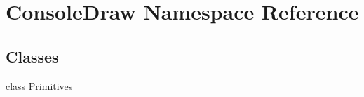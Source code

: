 \hypertarget{namespace_console_draw}{}\section{Console\+Draw Namespace Reference}
\label{namespace_console_draw}
\subsection*{Classes}
\begin{DoxyCompactItemize}
\item 
class \mbox{\hyperlink{class_console_draw_1_1_primitives}{Primitives}}
\end{DoxyCompactItemize}
